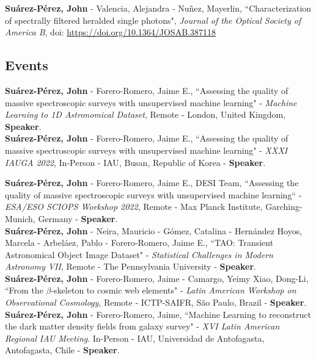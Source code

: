 \documentclass[10pt, a4paper]{article}
\newcommand{\years}[1]{\marginnote{\scriptsize #1}}
\begin{document}
\years{2020}\textbf{Suárez-Pérez, John} - Valencia, Alejandra - Nuñez, Mayerlin, “Characterization of spectrally filtered heralded single photons", \emph{Journal of the Optical Society of America B}, doi: \url{https://doi.org/10.1364/JOSAB.387118}





\subsection*{Events}
\noindent
\years{2023}\textbf{Suárez-Pérez, John} - Forero-Romero, Jaime E., “Assessing the quality of massive spectroscopic surveys with unsupervised machine learning" - \emph{Machine Learning to 1D Astronomical Dataset}, Remote - London, United Kingdom, \textbf{Speaker}.\\

\years{2022}\textbf{Suárez-Pérez, John} - Forero-Romero, Jaime E., “Assessing the quality of massive spectroscopic surveys with unsupervised machine learning" - \emph{XXXI IAUGA 2022}, In-Person - IAU, Busan, Republic of Korea - \textbf{Speaker}.\\
\newpage

\years{2022}\textbf{Suárez-Pérez, John} - Forero-Romero, Jaime E., DESI Team,  “Assessing the 
quality of massive spectroscopic surveys with unsupervised machine learning“ - \emph{ESA/ESO SCIOPS 
Workshop 2022}, Remote - Max Planck Institute, Garching-Munich, Germany - \textbf{Speaker}.\\

\years{2021}\textbf{Suárez-Pérez, John} - Neira, Mauricio - Gómez, Catalina - Hernández Hoyos, Marcela - Arbeláez, Pablo - Forero-Romero, Jaime E., “TAO: Transient Astronomical Object Image Dataset" - \emph{Statistical Challenges in Modern Astronomy VII}, Remote - The Pennsylvania University - \textbf{Speaker}.\\

\years{2020}\textbf{Suárez-Pérez, John} - Forero-Romero, Jaime - Camargo, Yeimy  Xiao, Dong-Li, “From the $\beta$-skeleton to cosmic web elements" - \emph{Latin American Workshop on Observational Cosmology}, Remote - ICTP-SAIFR, São Paulo, Brazil - \textbf{Speaker}.\\

\years{2019}\textbf{Suárez-Pérez, John} - Forero-Romero, Jaime, “Machine Learning to reconstruct the dark matter density fields from galaxy survey" - \emph{XVI Latin American Regional IAU Meeting}. In-Person - IAU, Universidad de Antofagasta, Antofagasta, Chile - \textbf{Speaker}.\\
\end{document}
